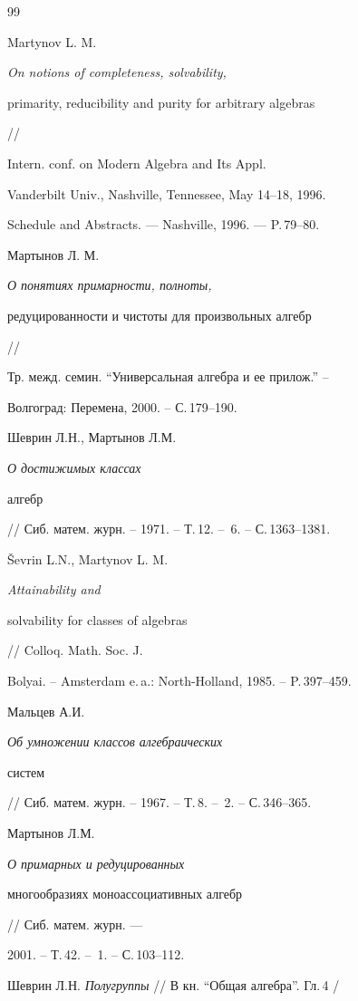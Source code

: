 \begin{thebibliography}{99}







Martynov L. M. {\em On notions of completeness, solvability,


primarity, reducibility and purity for arbitrary algebras} //


Intern. conf. on Modern Algebra and Its Appl.


Vanderbilt Univ., Nashville, Tennessee, May 14--18, 1996.


Schedule and Abstracts. --- Nashville, 1996. --- P.\,79--80.




Мартынов Л. М. {\em О понятиях примарности, полноты,


редуцированности и чистоты для произвольных алгебр} // 


Тр. межд. семин. ``Универсальная алгебра и ее прилож.'' --


Волгоград: Перемена, 2000. -- С.\,179--190. 




Шеврин Л.Н., Мартынов Л.М. {\em О достижимых классах


алгебр} // Сиб. матем. журн. -- 1971. -- Т.\,12. -- \No\,6. -- С.\,1363--1381.




\v Sevrin L.N., Martynov L. M. {\em Attainability and


solvability for classes of algebras} // Colloq. Math. Soc. J.


Bolyai. -- Amsterdam e.\,a.: North-Holland, 1985. -- P.\,397--459.




Мальцев А.И. {\em Об умножении классов алгебраических


систем} // Сиб. матем. журн. -- 1967. -- Т.\,8. -- \No\,2. -- С.\,346--365.




Мартынов Л.М. {\em О примарных и редуцированных


многообразиях моноассоциативных алгебр} // Сиб. матем. журн. ---


2001. -- Т.\,42. -- \No\,1. -- С.\,103--112.




Шеврин Л.Н. {\em Полугруппы} // В кн. ``Общая алгебра''. Гл.\,4 /



\end{thebibliography}
